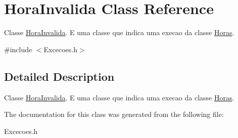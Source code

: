 \hypertarget{class_hora_invalida}{}\section{Hora\+Invalida Class Reference}
\label{class_hora_invalida}


Classe \hyperlink{class_hora_invalida}{Hora\+Invalida}. E uma classe que indica uma execao da classe \hyperlink{class_horas}{Horas}.  




{\ttfamily \#include $<$Excecoes.\+h$>$}



\subsection{Detailed Description}
Classe \hyperlink{class_hora_invalida}{Hora\+Invalida}. E uma classe que indica uma execao da classe \hyperlink{class_horas}{Horas}. 

The documentation for this class was generated from the following file\+:\begin{DoxyCompactItemize}
\item 
Excecoes.\+h\end{DoxyCompactItemize}

